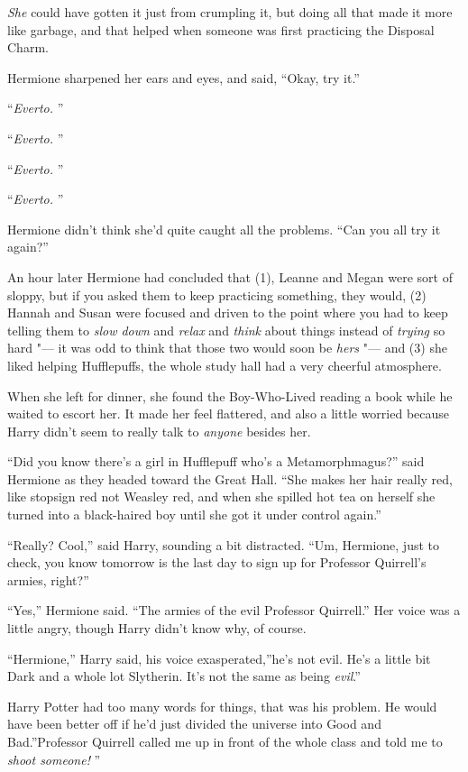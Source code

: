 \emph{She} could have gotten it just from crumpling it, but doing all
that made it more like garbage, and that helped when someone was first
practicing the Disposal Charm.

Hermione sharpened her ears and eyes, and said, ``Okay, try it.''

``\emph{Everto.} ''

``\emph{Everto.} ''

``\emph{Everto.} ''

``\emph{Everto.} ''

Hermione didn't think she'd quite caught all the problems. ``Can you all
try it again?''

An hour later Hermione had concluded that (1), Leanne and Megan were
sort of sloppy, but if you asked them to keep practicing something, they
would, (2) Hannah and Susan were focused and driven to the point where
you had to keep telling them to \emph{slow down} and \emph{relax} and
\emph{think} about things instead of \emph{trying} so hard "--- it was odd
to think that those two would soon be \emph{hers} "--- and (3) she liked
helping Hufflepuffs, the whole study hall had a very cheerful
atmosphere.

When she left for dinner, she found the Boy-Who-Lived reading a book
while he waited to escort her. It made her feel flattered, and also a
little worried because Harry didn't seem to really talk to \emph{anyone}
besides her.

``Did you know there's a girl in Hufflepuff who's a Metamorphmagus?''
said Hermione as they headed toward the Great Hall. ``She makes her hair
really red, like stopsign red not Weasley red, and when she spilled hot
tea on herself she turned into a black-haired boy until she got it under
control again.''

``Really? Cool,'' said Harry, sounding a bit distracted. ``Um, Hermione,
just to check, you know tomorrow is the last day to sign up for
Professor Quirrell's armies, right?''

``Yes,'' Hermione said. ``The armies of the evil Professor Quirrell.''
Her voice was a little angry, though Harry didn't know why, of course.

``Hermione,'' Harry said, his voice exasperated,''he's not evil. He's a
little bit Dark and a whole lot Slytherin. It's not the same as being
\emph{evil}.''

Harry Potter had too many words for things, that was his problem. He
would have been better off if he'd just divided the universe into Good
and Bad.''Professor Quirrell called me up in front of the whole class
and told me to \emph{shoot someone!} ''


